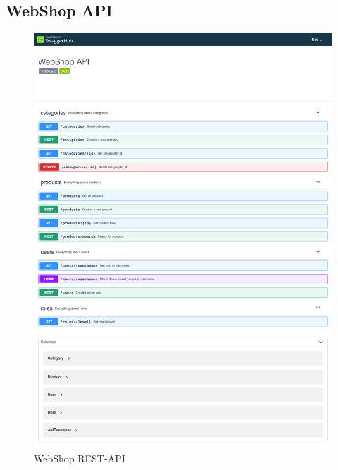 \documentclass[12pt,a4paper]{article}
\begin{document}
	\subsection{WebShop API}
	\begin{figure}[H]
		\centering
		\includegraphics[scale=0.25]{img/swagger-webshop-api.png}
		\caption{WebShop REST-API}
	\end{figure}
\end{document}
